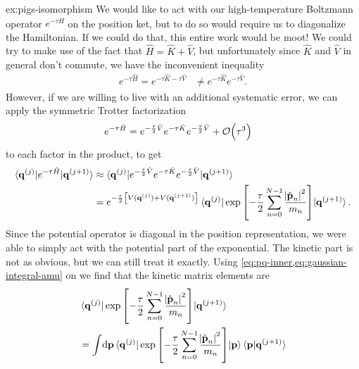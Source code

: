 \begin{DefAnswer}{ex:pigs-isomorphism}
	We would like to act with our high-temperature Boltzmann operator $e^{-\tau \hat{H}}$ on the position ket, but to do so would require us to diagonalize the Hamiltonian.
	If we could do that, this entire work would be moot!
	We could try to make use of the fact that $\hat{H} = \hat{K} + \hat{V}$, but unfortunately since $\hat{K}$ and $\hat{V}$ in general don't commute, we have the inconvenient inequality
	\begin{align}
		e^{-\tau \hat{H}}
		= e^{-\tau \hat{K} - \tau \hat{V}}
		&\ne e^{-\tau \hat{K}} e^{-\tau \hat{V}}.
	\end{align}
	However, if we are willing to live with an additional systematic error, we can apply the symmetric Trotter factorization~\cite{schmidt1995high}
	\begin{align}
		e^{-\tau \hat{H}}
		&= e^{-\frac{\tau}{2} \hat{V}} e^{-\tau \hat{K}} e^{-\frac{\tau}{2} \hat{V}} + \mathcal{O}\!\left( \tau^3 \right)
	\end{align}
	to each factor in the product, to get
	\begin{subequations}
	\begin{align}
		\braket{\bm{\mathbf{q}}^{(j)} | e^{-\tau \hat{H}} | \bm{\mathbf{q}}^{(j+1)}}
		&\approx \braket{
			\bm{\mathbf{q}}^{(j)} |
			e^{-\frac{\tau}{2} \hat{V}} e^{-\tau \hat{K}} e^{-\frac{\tau}{2} \hat{V}} |
			\bm{\mathbf{q}}^{(j+1)}
		} \\
		&= e^{-\frac{\tau}{2} \left[ V(\bm{\mathbf{q}}^{(j)}) + V(\bm{\mathbf{q}}^{(j+1)}) \right]}
			\braket{
				\bm{\mathbf{q}}^{(j)} |
				\exp{\left[ -\frac{\tau}{2} \sum_{n=0}^{N-1} \frac{\abs{\hat{\bm{\mathbf{p}}}_n}^2}{m_n} \right]} |
				\bm{\mathbf{q}}^{(j+1)}
			}.
	\end{align}
	\end{subequations}
	Since the potential operator is diagonal in the position representation, we were able to simply act with the potential part of the exponential.
	The kinetic part is not as obvious, but we can still treat it exactly.
	Using \cref{eq:pq-inner,eq:gaussian-integral-amu} on  we find that the kinetic matrix elements are
	\begin{subequations}
	\begin{align}
		& \braket{
			\vec{q}\bead{j} |
			\expb{-\frac{\tau}{2} \sum_{n=0}^{N-1} \frac{\abs{\hat{\vec{p}}_n}^2}{m_n}} |
			\vec{q}\bead{j+1}
		} \notag \\
		&= \int\! \dif \vec{p}
				\braket{
					\vec{q}\bead{j} |
					\expb{-\frac{\tau}{2} \sum_{n=0}^{N-1} \frac{\abs{\hat{\vec{p}}_n}^2}{m_n}} |
					\vec{p}
				}
				\braket{\vec{p} | \vec{q}\bead{j+1}} \\

\end{align}
\end{subequations}
\end{DefAnswer}
